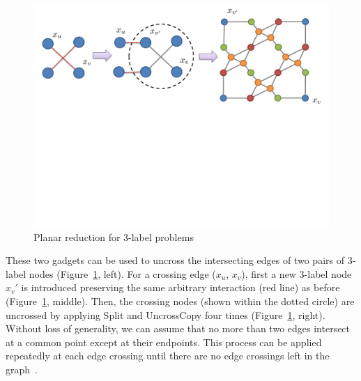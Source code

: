 \begin{figure}
\begin{center}
   \includegraphics[trim={0 10.5cm 0 0}, clip, width=0.7\linewidth]{figure/Planar/Planar-3.pdf}
\end{center}
\caption{Planar reduction for 3-label problems} \label{fig:planarreduct}
\end{figure}

These two gadgets can be used to uncross the intersecting edges of two pairs of 3-label nodes (Figure~\ref{fig:planarreduct}, left).  For a crossing edge ($x_u$, $x_v$), first a new 3-label node $x_v'$ is introduced preserving the same arbitrary interaction (red line) as before (Figure~\ref{fig:planarreduct}, middle). Then, the crossing nodes (shown within the dotted circle) are uncrossed by applying {\sc Split} and {\sc UncrossCopy} four times (Figure~\ref{fig:planarreduct}, right).
Without loss of generality, we can assume that no more than two edges intersect at a common point except at their endpoints.  This process can be applied repeatedly at each edge crossing until there are no edge crossings left in the graph~\cite{prusa2015universality}.
